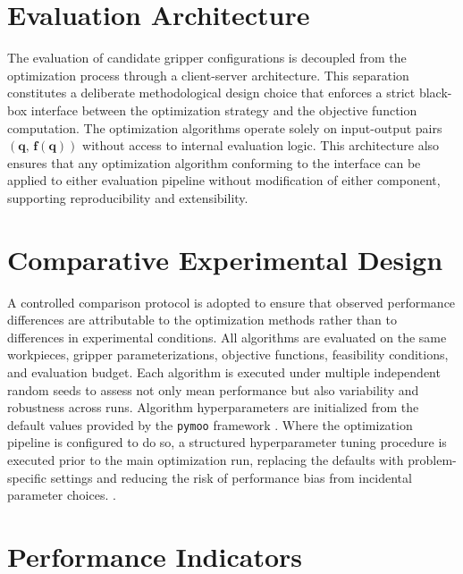 \section{Evaluation Architecture}
\label{sec:methodology_evaluation_architecture}

The evaluation of candidate gripper configurations is decoupled from the optimization process through a client-server architecture. This separation
constitutes a deliberate methodological design choice that enforces a strict black-box interface between the optimization strategy and the objective
function computation. The optimization algorithms operate solely on input-output pairs $(\mathbf{q},\, \mathbf{f}(\mathbf{q}))$ without access to
internal evaluation logic\cite{Bischl2017mlrMBO:}. This architecture also ensures that any optimization algorithm conforming to the interface can be
applied to either evaluation pipeline without modification of either component, supporting reproducibility and extensibility.

\section{Comparative Experimental Design}
\label{sec:methodology_comparative_experiments}

A controlled comparison protocol is adopted to ensure that observed performance differences are attributable to the optimization methods rather than
to differences in experimental conditions. All algorithms are evaluated on the same workpieces, gripper parameterizations, objective functions,
feasibility conditions, and evaluation budget. Each algorithm is executed under multiple independent random seeds to assess not only mean performance
but also variability and robustness across runs\cite{Bouthillier2021Accounting}. Algorithm hyperparameters are initialized from the default values
provided by the \texttt{pymoo} framework \cite{pymoo}. Where the optimization pipeline is configured to do so, a structured hyperparameter tuning
procedure is executed prior to the main optimization run, replacing the defaults with problem-specific settings and reducing the risk of performance
bias from incidental parameter choices. \cite{Beiranvand2017Best}.

\section{Performance Indicators}
\label{sec:methodology_performance_indicators}

